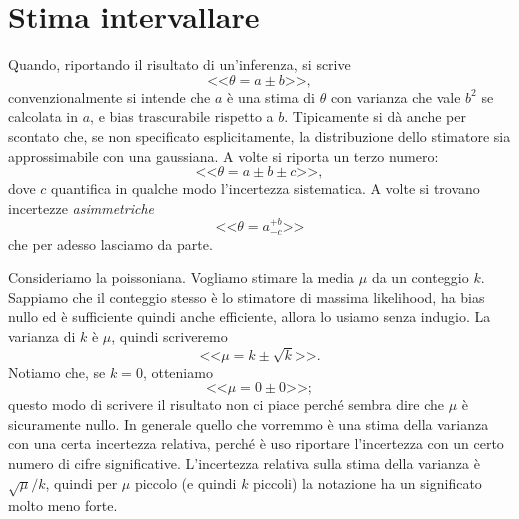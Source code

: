 
\section{Stima intervallare}
\label{sec:intervallare}

Quando, riportando il risultato di un'inferenza, si scrive
\begin{equation*}
	\text{<<}\theta = a \pm b\text{>>},
\end{equation*}
convenzionalmente si intende che $a$ è una stima di $\theta$ con varianza che vale $b^2$ se calcolata in $a$,
e bias trascurabile rispetto a $b$.
Tipicamente si dà anche per scontato che,
se non specificato esplicitamente,
la distribuzione dello stimatore sia approssimabile con una gaussiana.
A volte si riporta un terzo numero:
\begin{equation*}
	\text{<<}\theta = a \pm b \pm c\text{>>},
\end{equation*}
dove $c$ quantifica in qualche modo l'incertezza sistematica.
A volte si trovano incertezze \emph{asimmetriche}
\begin{equation*}
	\text{<<}\theta = a^{+b}_{-c}\text{>>}
\end{equation*}
che per adesso lasciamo da parte.

\begin{example}
	Consideriamo la poissoniana.
	Vogliamo stimare la media $\mu$ da un conteggio $k$.
	Sappiamo che il conteggio stesso è lo stimatore di massima likelihood,
	ha bias nullo ed è sufficiente quindi anche efficiente,
	allora lo usiamo senza indugio.
	La varianza di $k$ è $\mu$,
	quindi scriveremo
	\begin{equation*}
		\text{<<}\mu = k \pm \sqrt k\text{>>}.
	\end{equation*}
	Notiamo che, se $k=0$, otteniamo
	\begin{equation*}
		\text{<<}\mu = 0 \pm 0\text{>>};
	\end{equation*}
	questo modo di scrivere il risultato non ci piace perché sembra dire che $\mu$ è sicuramente nullo.
	In generale quello che vorremmo è una stima della varianza con una certa incertezza relativa,
	perché è uso riportare l'incertezza con un certo numero di cifre significative.
	L'incertezza relativa sulla stima della varianza è $\sqrt\mu / k$,
	quindi per $\mu$ piccolo (e quindi $k$ piccoli) la notazione ha un significato molto meno forte.
\end{example}

